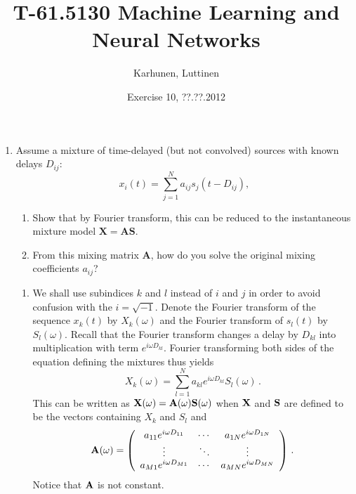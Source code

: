 
\title{T-61.5130 Machine Learning and Neural Networks}
\author{Karhunen, Luttinen}
\date{Exercise 10, ??.??.2012}

\newcommand{\vect}[1]{{\bf{#1}}}
\newcommand{\svect}[1]{\boldsymbol{#1}}
\newcommand{\matr}[1]{\boldsymbol{#1}}




\maketitle

\begin{enumerate}


\item Assume a mixture of time-delayed (but not convolved) sources with known delays $D_{ij}$:
  \begin{displaymath}
    x_i(t) = \sum_{j=1}^N a_{ij}s_j(t-D_{ij}),
  \end{displaymath}
  \begin{enumerate}
  \item Show that by Fourier transform, this can be reduced to the instantaneous mixture
    model $\mathbf{X} = \mathbf{A} \mathbf{S}$.
  \item From this mixing matrix $\mathbf{A}$, how do you solve the original mixing
    coefficients $a_{ij}$?
  \end{enumerate}

  \begin{solution}


    \begin{enumerate}
    \item We shall use subindices $k$ and $l$ instead of $i$ and $j$ in
      order to avoid confusion with the $i = \sqrt{-1}$.  Denote the
      Fourier transform of the sequence $x_k(t)$ by $X_k(\omega)$ and
      the Fourier transform of $s_l(t)$ by $S_l(\omega)$.  Recall that
      the Fourier transform changes a delay by $D_{kl}$ into
      multiplication with term $e^{i\omega D_{kl}}$.  Fourier
      transforming both sides of the equation defining the mixtures thus
      yields $$X_k(\omega) = \sum_{l=1}^N a_{kl} e^{i\omega D_{kl}}
      S_l(\omega) \, .$$ This can be written as $\bf{X}(\omega) =
      \bf{A}(\omega) \bf{S}(\omega)$ when $\bf{X}$ and $\bf{S}$ are
      defined to be the vectors containing $X_k$ and $S_l$ and
      \[
      \bf{A}(\omega) = \left( \begin{array}{ccc} a_{11}e^{i\omega
            D_{11}} & \cdots & a_{1N}e^{i\omega D_{1N}} \\ \vdots & \ddots &
          \vdots \\ a_{M1}e^{i\omega D_{M1}} & \cdots & a_{MN}e^{i\omega
            D_{MN}} \end{array} \right) \, .
      \] Notice that ${\bf A}$ is not
      constant.


\end{enumerate}
\end{solution}
\end{enumerate}
